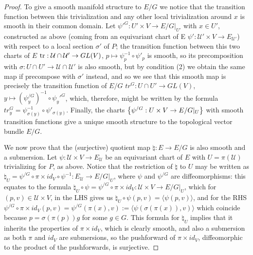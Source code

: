 \begin{proof}
To give a smooth manifold structure to $E/G$ we notice that the transition function between this trivialization and any other local trivialization around $x$ is smooth in their common domain. Let $\psi'^G:U' \times V \to E/G|_{U'}$ with $x \in U'$, constructed as above (coming from an equivariant chart of E $\psi': \mathcal U' \times V \to E_{\mathcal U'}$) with respect to a local section $\sigma'$ of $P$; the transition function between this two charts of $E$ $\operatorname{tr}: \mathcal U \cap \mathcal U' \to GL(V)$, $p \mapsto \psi^{-1}_p \circ \psi'_p$ is smooth, so its precomposition with $\sigma: U \cap U' \to \mathcal U \cap \mathcal U'$ is also smooth, but by condition (2) we obtain the same map if precompose with $\sigma'$ instead, and so we see that this smooth map is precisely the transition function of $E/G$ $tr^{G}: U \cap U' \to GL(V)$, $y \mapsto (\psi_y^{/G})^{-1} \circ \psi_y'^G$, which, therefore, might be written by the formula $tr^G_y = \psi^{-1}_{\sigma(y)} \circ \psi'_{\sigma(y)}$. Finally, the charts $\left\{ \psi^{/G}:U \times V \to E/G|_U \right\}$ with smooth transition functions give a unique smooth structure to the topological vector bundle $E/G$.

We now prove that the (surjective) quotient map $\natural : E \to E/G$ is also smooth and a submersion. Let $\psi: \mathcal U \times V \to E_{\mathcal U}$ be an equivariant chart of $E$ with $U = \pi(\mathcal U)$ trivializing for $P$, as above. Notice that the restriction of $\natural$ to $U$ may be written as $\natural_U = \psi^{/G} \circ \pi \times id_V \circ \psi^{-1}: E_{\mathcal U} \to E/G|_U$, where $\psi$ and $\psi^{/G}$ are diffeomorphisms: this equates to the formula $\natural_U \circ \psi = \psi^{/G} \circ \pi \times id_V: \mathcal U \times V \to E/G|_U$, which for $(p, v) \in \mathcal U \times V$, in the LHS gives us $\natural_U \circ \psi(p, v) = \langle\psi(p, v)\rangle$, and for the RHS $\psi^{/G} \circ \pi \times id_V (p, v) = \psi^{/G}(\pi(x), v) := \langle\psi(\sigma(\pi(x)), v)\rangle$ which coincide because $p = \sigma(\pi(p))g$ for some $g \in G$. This formula for $\natural_U$ implies that it inherits the properties of $\pi \times id_V$, which is clearly smooth, and also a submersion as both $\pi$ and $id_V$ are submersions, so the pushforward of $\pi \times id_V$, diffeomorphic to the product of the pushforwards, is surjective.


\end{proof}
